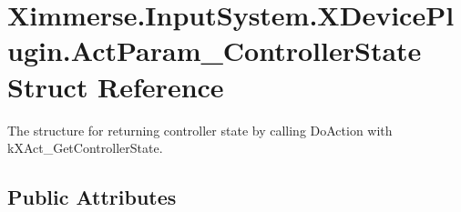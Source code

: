 \hypertarget{struct_ximmerse_1_1_input_system_1_1_x_device_plugin_1_1_act_param___controller_state}{}\section{Ximmerse.\+Input\+System.\+X\+Device\+Plugin.\+Act\+Param\+\_\+\+Controller\+State Struct Reference}
\label{struct_ximmerse_1_1_input_system_1_1_x_device_plugin_1_1_act_param___controller_state}


The structure for returning controller state by calling Do\+Action with k\+X\+Act\+\_\+\+Get\+Controller\+State.  


\subsection*{Public Attributes}
